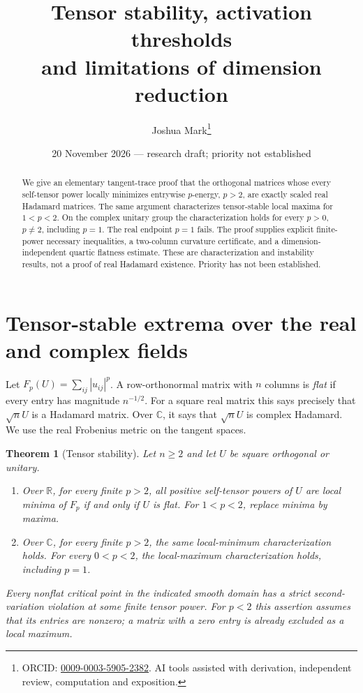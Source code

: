 \documentclass[11pt]{article}
\title{Tensor stability, activation thresholds\\and limitations of dimension reduction}
\author{Joshua Mark\thanks{ORCID: \href{https://orcid.org/0009-0003-5905-2382}{0009-0003-5905-2382}. AI tools assisted with derivation, independent review, computation and exposition.}}
\date{20 November 2026 --- research draft; priority not established}
\newtheorem{theorem}{Theorem}[section]
\begin{document}
\maketitle
\begin{abstract}
We give an elementary tangent-trace proof that the orthogonal matrices
whose every self-tensor power locally minimizes entrywise $p$-energy,
$p>2$, are exactly scaled real Hadamard matrices. The same argument
characterizes tensor-stable local maxima for $1<p<2$. On the complex
unitary group the characterization holds for every $p>0$, $p\ne2$,
including $p=1$. The real endpoint $p=1$ fails. The proof supplies
explicit finite-power necessary inequalities, a two-column curvature
certificate, and a dimension-independent quartic flatness estimate.
These are characterization and instability results, not a proof of
real Hadamard existence. Priority has not been established.
\end{abstract}

\section{Tensor-stable extrema over the real and complex fields}
Let $F_p(U)=\sum_{ij}|u_{ij}|^p$. A row-orthonormal matrix with $n$
columns is \emph{flat} if every entry has magnitude $n^{-1/2}$.
For a square real matrix this says precisely that $\sqrt nU$ is a
Hadamard matrix. Over $\mathbb C$, it says that $\sqrt nU$ is complex
Hadamard. We use the real Frobenius metric on the tangent spaces.

\begin{theorem}[Tensor stability]\label{thm:unified}
Let $n\ge2$ and let $U$ be square orthogonal or unitary.
\begin{enumerate}
\item Over $\mathbb R$, for every finite $p>2$, all positive
self-tensor powers of $U$ are local minima of $F_p$ if and only if
$U$ is flat. For $1<p<2$, replace minima by maxima.
\item Over $\mathbb C$, for every finite $p>2$, the same local-minimum
characterization holds. For every $0<p<2$, the local-maximum
characterization holds, including $p=1$.
\end{enumerate}
Every nonflat critical point in the indicated smooth domain has a
strict second-variation violation at some finite tensor power. For
$p<2$ this assertion assumes that its entries are nonzero; a matrix
with a zero entry is already excluded as a local maximum.
\end{theorem}
\end{document}
